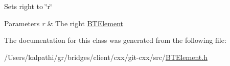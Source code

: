 Sets right to \char`\"{}r\char`\"{} 
\begin{DoxyParams}{Parameters}
{\em r} & The right \hyperlink{classbridges_1_1_b_t_element}{B\+T\+Element} \\
\hline
\end{DoxyParams}


The documentation for this class was generated from the following file\+:\begin{DoxyCompactItemize}
\item 
/\+Users/kalpathi/gr/bridges/client/cxx/git-\/cxx/src/\hyperlink{_b_t_element_8h}{B\+T\+Element.\+h}\end{DoxyCompactItemize}
